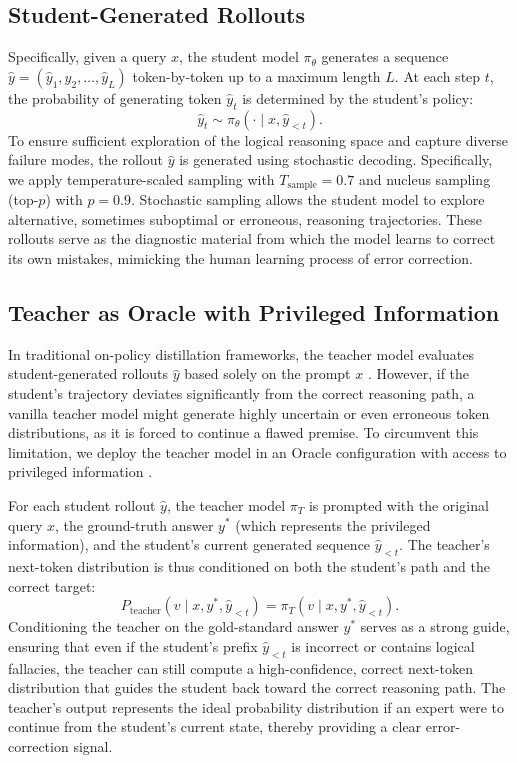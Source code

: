 \subsection{Student-Generated Rollouts}

Specifically, given a query $x$, the student model $\pi_\theta$ generates a sequence $\hat{y} = (\hat{y}_1, \hat{y}_2, \dots, \hat{y}_L)$ token-by-token up to a maximum length $L$. At each step $t$, the probability of generating token $\hat{y}_t$ is determined by the student's policy:
\begin{equation}
    \hat{y}_t \sim \pi_\theta(\cdot \mid x, \hat{y}_{<t}).
\end{equation}
To ensure sufficient exploration of the logical reasoning space and capture diverse failure modes, the rollout $\hat{y}$ is generated using stochastic decoding. Specifically, we apply temperature-scaled sampling with $T_{\text{sample}} = 0.7$ and nucleus sampling (top-$p$) with $p = 0.9$. Stochastic sampling allows the student model to explore alternative, sometimes suboptimal or erroneous, reasoning trajectories. These rollouts serve as the diagnostic material from which the model learns to correct its own mistakes, mimicking the human learning process of error correction.

\subsection{Teacher as Oracle with Privileged Information}

In traditional on-policy distillation frameworks, the teacher model evaluates student-generated rollouts $\hat{y}$ based solely on the prompt $x$ \parencite{agarwal2024onpolicydistillationlanguagemodels}. However, if the student's trajectory deviates significantly from the correct reasoning path, a vanilla teacher model might generate highly uncertain or even erroneous token distributions, as it is forced to continue a flawed premise. To circumvent this limitation, we deploy the teacher model in an Oracle configuration with access to privileged information \parencite{zhao2026selfdistilledreasoneronpolicyselfdistillation,zhao2026trainingharnessesonpolicyharness}.

For each student rollout $\hat{y}$, the teacher model $\pi_T$ is prompted with the original query $x$, the ground-truth answer $y^*$ (which represents the privileged information), and the student's current generated sequence $\hat{y}_{<t}$. The teacher's next-token distribution is thus conditioned on both the student's path and the correct target:
\begin{equation}
    P_{\text{teacher}}(v \mid x, y^*, \hat{y}_{<t}) = \pi_T(v \mid x, y^*, \hat{y}_{<t}).
\end{equation}
Conditioning the teacher on the gold-standard answer $y^*$ serves as a strong guide, ensuring that even if the student's prefix $\hat{y}_{<t}$ is incorrect or contains logical fallacies, the teacher can still compute a high-confidence, correct next-token distribution that guides the student back toward the correct reasoning path. The teacher's output represents the ideal probability distribution if an expert were to continue from the student's current state, thereby providing a clear error-correction signal.

